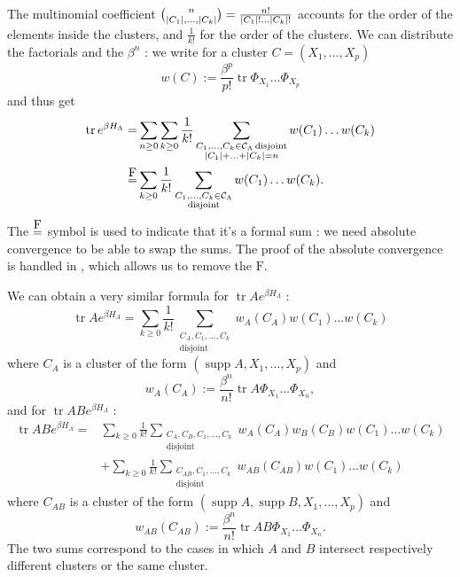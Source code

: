 \documentclass[french]{article}
\DeclarePairedDelimiter\abs{\lvert}{\rvert}
\DeclareMathOperator{\disj}{disjoint}
\DeclareMathOperator{\tr}{tr}
\DeclareMathOperator{\supp}{supp}
\newcommand\formeq{\stackrel{\mathclap{\normalfont\mbox{F}}}{=}}
\begin{document}
    The multinomial coefficient $\binom{n}{\abs{C_1},\ldots,\abs{C_k}}=\frac{n!}{\abs{C_1}!\ldots\abs{C_k}!}$ accounts for the order of the elements inside the clusters, and $\frac{1}{k!}$ for the order of the clusters.
    We can distribute the factorials and the $\beta^n$ : we write for a cluster $C=(X_1,\ldots,X_p)$
    $$
    w(C):=\frac {\beta^p}{p!}\tr \Phi_{X_1}\ldots\Phi_{X_p}
    $$
    and thus get 
    \begin{align*}
        \tr e^{\beta H_\Lambda}=&\sum_{n\geq0}\sum_{k\geq 0}\frac 1{k!}\sum_{\substack{C_1,\ldots,C_k\in\mathcal C_\Lambda \disj\\\abs{C_1}+\ldots+\abs{C_k}=n}}w(C_1)\ldots w(C_k)\\
        \formeq&\sum_{k\geq 0}\frac 1{k!} \sum_{\substack{C_1,\ldots,C_k\in\mathcal C_\Lambda\\\disj}}w(C_1)\ldots w(C_k).
    \end{align*}
    The $\formeq$ symbol is used to indicate that it’s a formal sum : we need absolute convergence to be able to swap the sums. 
    The proof of the absolute convergence is handled in \cite{friedliChapterClusterExpansion2017}, which allows us to remove the $\text{F}$.
    
    We can obtain a very similar formula for $\tr Ae^{\beta H_\Lambda}$ :
    \begin{equation*}
        \tr Ae^{\beta H_\Lambda}=\sum_{k\geq 0}\frac 1 {k!} \sum_{\substack{C_A,C_1,\ldots,C_k\\\disj}}w_A(C_A)w(C_1)\ldots w(C_k)
    \end{equation*}
    where $C_A$ is a cluster of the form $(\supp A,X_1,\ldots,X_p)$ and $$
        w_A(C_A):=\frac{\beta^n}{n!}\tr A\Phi_{X_1}\ldots\Phi_{X_n},
    $$
    and for $\tr ABe^{\beta H_\Lambda}$ :\begin{align*}
        \tr ABe^{\beta H_\Lambda}=&\sum_{k\geq 0}\frac 1 {k!} \sum_{\substack{C_A,C_B,C_1,\ldots,C_k\\\disj}}w_A(C_A)w_B(C_B)w(C_1)\ldots w(C_k)\\
        &+\sum_{k\geq 0}\frac 1 {k!} \sum_{\substack{C_{AB},C_1,\ldots,C_k\\\disj}}w_{AB}(C_{AB})w(C_1)\ldots w(C_k)
        \end{align*}
        where $C_{AB}$ is a cluster of the form $(\supp A, \supp B,X_1,\ldots,X_p)$ and
        $$
        w_{AB}(C_{AB}):=\frac{\beta^n}{n!}\tr AB\Phi_{X_1}\ldots\Phi_{X_n}.
        $$
        The two sums correspond to the cases in which $A$ and $B$ intersect respectively different clusters or the same cluster.
     
\end{document}
